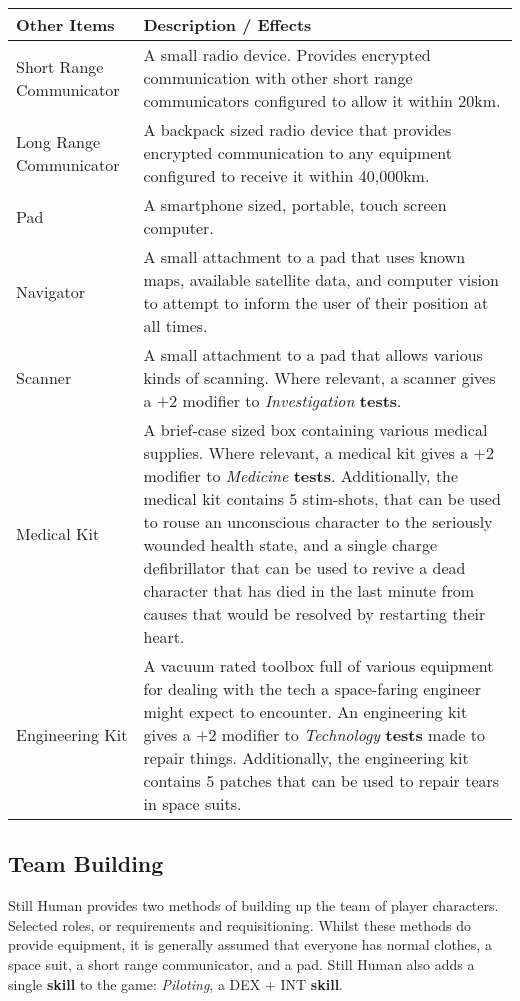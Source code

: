 \documentclass[11pt]{article}
\begin{document}
\begin{multicols}{3}
  \begin{tabularx}{\linewidth}{lX}
    Other Items & Description / Effects \\
    \hline
    Short Range Communicator & A small radio device. Provides encrypted communication with other short range communicators configured to allow it within 20km. \\
    Long Range Communicator & A backpack sized radio device that provides encrypted communication to any equipment configured to receive it within 40,000km. \\
    Pad & A smartphone sized, portable, touch screen computer. \\
    Navigator & A small attachment to a pad that uses known maps, available satellite data, and computer vision to attempt to inform the user of their position at all times. \\
    Scanner & A small attachment to a pad that allows various kinds of scanning. Where relevant, a scanner gives a $+2$ modifier to \textit{Investigation} \textbf{tests}. \\
    Medical Kit & A brief-case sized box containing various medical supplies. Where relevant, a medical kit gives a $+2$ modifier to \textit{Medicine} \textbf{tests}. Additionally, the medical kit contains $5$ stim-shots, that can be used to rouse an unconscious character to the seriously wounded health state, and a single charge defibrillator that can be used to revive a dead character that has died in the last minute from causes that would be resolved by restarting their heart. \\
    Engineering Kit & A vacuum rated toolbox full of various equipment for dealing with the tech a space-faring engineer might expect to encounter. An engineering kit gives a $+2$ modifier to \textit{Technology} \textbf{tests} made to repair things. Additionally, the engineering kit contains $5$ patches that can be used to repair tears in space suits.
  \end{tabularx}

  \subsection*{Team Building}

  Still Human provides two methods of building up the team of player characters. Selected roles, or requirements and requisitioning. Whilst these methods do provide equipment, it is generally assumed that everyone has normal clothes, a space suit, a short range communicator, and a pad. Still Human also adds a single \textbf{skill} to the game: \textit{Piloting}, a DEX + INT \textbf{skill}.


\end{multicols}
\end{document}
